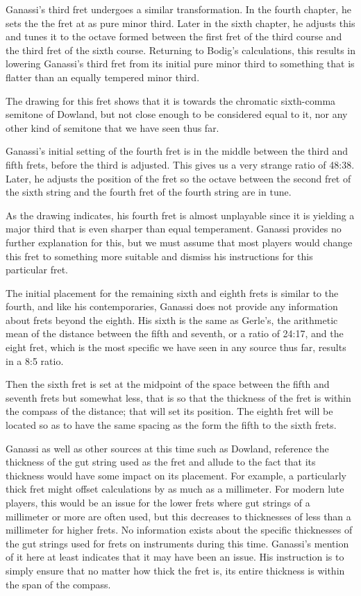 Ganassi's third fret undergoes a similar transformation.  In the fourth chapter, he
sets the the fret at as pure minor third.  Later in the sixth chapter, he adjusts this
and tunes it to the octave formed between the first fret of the third course and the
third fret of the sixth course. Returning to Bodig's calculations, this results in
lowering Ganassi's third fret from its initial pure minor third to something that is
flatter than an equally tempered minor third.

The drawing for this fret shows that it is towards the chromatic sixth-comma semitone
of Dowland, but not close enough to be considered equal to it, nor any other kind of
semitone that we have seen thus far.

Ganassi's initial setting of the fourth fret is in the middle between the third and
fifth frets, before the third is adjusted.  This gives us a very strange ratio of
48:38.  Later, he adjusts the position of the fret so the octave between the second
fret of the sixth string and the fourth fret of the fourth string are in tune.

As the drawing indicates, his fourth fret is almost unplayable since it is yielding a
major third that is even sharper than equal temperament.  Ganassi provides no further
explanation for this, but we must assume that most players would change this fret to
something more suitable and dismiss his instructions for this particular fret.

The initial placement for the remaining sixth and eighth frets is similar to the
fourth, and like his contemporaries, Ganassi does not provide any information about
frets beyond the eighth.  His sixth is the same as Gerle's, the arithmetic mean of the
distance between the fifth and seventh, or a ratio of 24:17, and the eight fret, which
is the most specific we have seen in any source thus far, results in a 8:5 ratio.
\begin{blocks}
Then the sixth fret is set at the midpoint of the space between the fifth and seventh
frets but somewhat less, that is so that the thickness of the fret is within the
compass of the distance; that will set its position.  The eighth fret will be located
so as to have the same spacing as the form the fifth to the sixth frets.
\end{blocks}
Ganassi as well as other sources at this time such as Dowland, reference the thickness
of the gut string used as the fret and allude to the fact that its thickness would have
some impact on its placement.  For example, a particularly thick fret might offset
calculations by as much as a millimeter.  For modern lute players, this would be an
issue for the lower frets where gut strings of a millimeter or more are often used, but
this decreases to thicknesses of less than a millimeter for higher frets. No
information exists about the specific thicknesses of the gut strings used for frets on
instruments during this time.  Ganassi's mention of it here at least indicates that it
may have been an issue.  His instruction is to simply ensure that no matter how thick
the fret is, its entire thickness is within the span of the compass.

